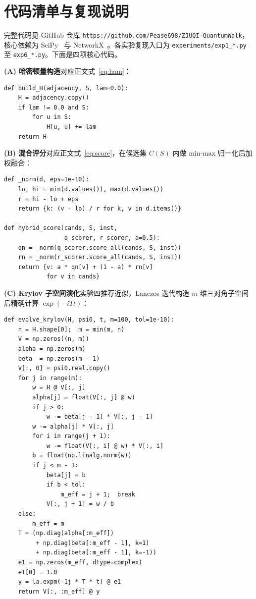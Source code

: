 \documentclass[pre,twocolumn]{revtex4-2}
\begin{document}
\appendix
\section{代码清单与复现说明}

完整代码见 GitHub 仓库 \texttt{https://github.com/Pease698/ZJUQI-QuantumWalk}，核心依赖为 SciPy~\cite{scipy2020} 与 NetworkX~\cite{networkx2008}。各实验复现入口为 \texttt{experiments/exp1\_*.py} 至 \texttt{exp6\_*.py}。下面是四项核心代码。

\medskip
\noindent\textbf{(A) 哈密顿量构造}\quad 对应正文式~\eqref{eq:ham}：
\begin{verbatim}
def build_H(adjacency, S, lam=0.0):
    H = adjacency.copy()
    if lam != 0.0 and S:
        for u in S:
            H[u, u] += lam
    return H
\end{verbatim}

\medskip
\noindent\textbf{(B) 混合评分}\quad 对应正文式~\eqref{eq:score}，在候选集 $C(S)$ 内做 min-max 归一化后加权融合：
\begin{verbatim}
def _norm(d, eps=1e-10):
    lo, hi = min(d.values()), max(d.values())
    r = hi - lo + eps
    return {k: (v - lo) / r for k, v in d.items()}

def hybrid_score(cands, S, inst,
                 q_scorer, r_scorer, a=0.5):
    qn = _norm(q_scorer.score_all(cands, S, inst))
    rn = _norm(r_scorer.score_all(cands, S, inst))
    return {v: a * qn[v] + (1 - a) * rn[v]
            for v in cands}
\end{verbatim}

\medskip
\noindent\textbf{(C) Krylov 子空间演化}\quad 实验四推荐近似，Lanczos 迭代构造 $m$ 维三对角子空间后精确计算 $\exp(-iTt)$：
\begin{verbatim}
def evolve_krylov(H, psi0, t, m=100, tol=1e-10):
    n = H.shape[0];  m = min(m, n)
    V = np.zeros((n, m))
    alpha = np.zeros(m)
    beta  = np.zeros(m - 1)
    V[:, 0] = psi0.real.copy()
    for j in range(m):
        w = H @ V[:, j]
        alpha[j] = float(V[:, j] @ w)
        if j > 0:
            w -= beta[j - 1] * V[:, j - 1]
        w -= alpha[j] * V[:, j]
        for i in range(j + 1):
            w -= float(V[:, i] @ w) * V[:, i]
        b = float(np.linalg.norm(w))
        if j < m - 1:
            beta[j] = b
            if b < tol:
                m_eff = j + 1;  break
            V[:, j + 1] = w / b
    else:
        m_eff = m
    T = (np.diag(alpha[:m_eff])
         + np.diag(beta[:m_eff - 1], k=1)
         + np.diag(beta[:m_eff - 1], k=-1))
    e1 = np.zeros(m_eff, dtype=complex)
    e1[0] = 1.0
    y = la.expm(-1j * T * t) @ e1
    return V[:, :m_eff] @ y
\end{verbatim}
\end{document}
